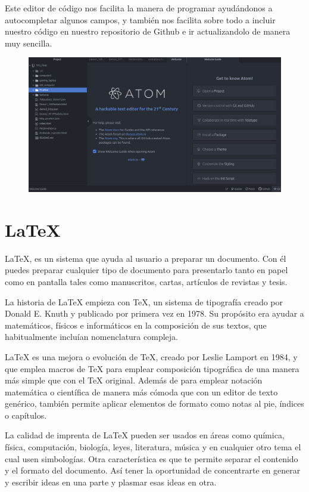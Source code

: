 \documentclass[a4paper, 12pt]{book}
\begin{document}
Este editor de código nos facilita la manera de programar ayudándonos a autocompletar algunos campos, y también nos facilita sobre todo a incluir nuestro código en nuestro repositorio de Github e ir actualizandolo de manera muy sencilla.

\begin{figure}[h]
\centering
 \includegraphics[scale=0.35]{img/github.png}
\end{figure}


\newpage
\section{LaTeX} 
\label{sec:LaTeX}


LaTeX, es un sistema que ayuda al usuario a preparar un documento. Con él puedes preparar cualquier tipo de documento para presentarlo tanto en papel como en pantalla tales como manuscritos, cartas, artículos de revistas y tesis.

La historia de LaTeX empieza con TeX, un sistema de tipografía creado por Donald E. Knuth y publicado por primera vez en 1978. Su propósito era ayudar a matemáticos, físicos e informáticos en la composición de sus textos, que habitualmente incluían nomenclatura compleja.

LaTeX es una mejora o evolución de TeX, creado por Leslie Lamport en 1984, y que emplea macros de TeX para emplear composición tipográfica de una manera más simple que con el TeX original. 
Además de para emplear notación matemática o científica de manera más cómoda que con un editor de texto genérico, también permite aplicar elementos de formato como notas al pie, índices o capítulos.

La calidad de imprenta de LaTeX pueden ser usados en áreas como química, física, computación, biología, leyes, literatura, música y en cualquier otro tema el cual usen simbologías.
Otra característica es que te permite separar el contenido y el formato del documento. Así tener la oportunidad de concentrarte en generar y escribir ideas en una parte y plasmar esas ideas en otra.
\end{document}
